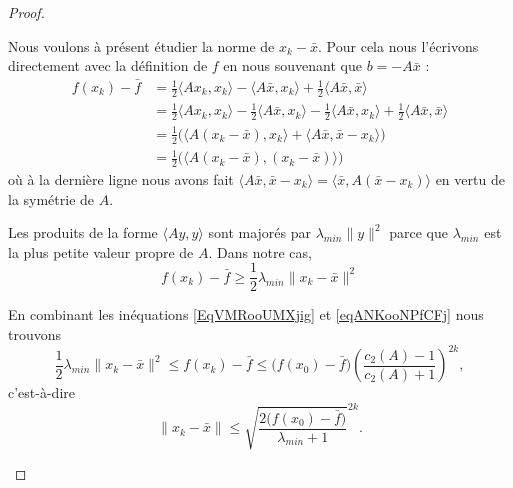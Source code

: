 \begin{proof}
\begin{subproof}
		Nous voulons à présent étudier la norme de \( x_k-\bar x\). Pour cela nous l'écrivons directement avec la définition de \( f\) en nous souvenant que \( b=-A\bar x\) :
		\begin{subequations}
			\begin{align}
				f(x_k)-\bar f & =\frac{ 1 }{2}\langle Ax_k, x_k\rangle -\langle A\bar x, x_k\rangle +\frac{ 1 }{2}\langle A\bar x, \bar x\rangle                                                       \\
				              & =\frac{ 1 }{2}\langle Ax_k, x_k\rangle -\frac{ 1 }{2}\langle A\bar x, x_k\rangle-\frac{ 1 }{2}\langle A\bar x, x_k\rangle +\frac{ 1 }{2}\langle A\bar x, \bar x\rangle \\
				              & =\frac{ 1 }{2}\Big( \langle A(x_k-\bar x), x_k\rangle +\langle A\bar x, \bar x-x_k\rangle  \Big)                                                                       \\
				              & =\frac{ 1 }{2}\Big( \langle A(x_k-\bar x), (x_k-\bar x)\rangle  \Big)
			\end{align}
		\end{subequations}
		où à la dernière ligne nous avons fait \( \langle A\bar x, \bar x-x_k\rangle =\langle \bar x, A(\bar x-x_k)\rangle \) en vertu de la symétrie de \( A\).

		Les produits de la forme \( \langle Ay, y\rangle \) sont majorés par \( \lambda_{min}\| y \|^2\) parce que \( \lambda_{min}\) est la plus petite valeur propre de \( A\). Dans notre cas,
		\begin{equation}    \label{EqVMRooUMXjig}
			f(x_k)-\bar f\geq \frac{ 1 }{2}\lambda_{min}\| x_k-\bar x \|^2
		\end{equation}

		\spitem[Conclusion]

		En combinant les inéquations \eqref{EqVMRooUMXjig} et \eqref{eqANKooNPfCFj} nous trouvons
		\begin{equation}
			\frac{ 1 }{2}\lambda_{min}\| x_k-\bar x \|^2\leq f(x_k)-\bar f\leq \big( f(x_0)-\bar f \big)\left( \frac{ c_2(A)-1 }{ c_2(A)+1 } \right)^{2k},
		\end{equation}
		c'est-à-dire
		\begin{equation}
			\| x_k-\bar x \|\leq \sqrt{\frac{ 2\big( f(x_0)-\bar f \big) }{ \lambda_{min} +1}}^{2k}.
		\end{equation}
	\end{subproof}
\end{proof}

